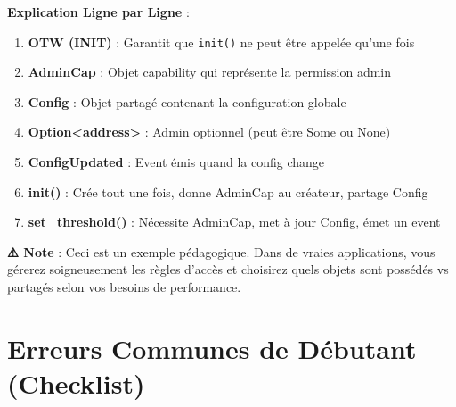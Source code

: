 \documentclass[11pt]{article}
\begin{document}
\begin{explainBox}
\textbf{Explication Ligne par Ligne} :
\begin{enumerate}
  \item \textbf{OTW (INIT)} : Garantit que \texttt{init()} ne peut être appelée qu'une fois
  \item \textbf{AdminCap} : Objet capability qui représente la permission admin
  \item \textbf{Config} : Objet partagé contenant la configuration globale
  \item \textbf{Option<address>} : Admin optionnel (peut être Some ou None)
  \item \textbf{ConfigUpdated} : Event émis quand la config change
  \item \textbf{init()} : Crée tout une fois, donne AdminCap au créateur, partage Config
  \item \textbf{set\_threshold()} : Nécessite AdminCap, met à jour Config, émet un event
\end{enumerate}
\end{explainBox}

\begin{warnBox}
\textbf{⚠️ Note} : Ceci est un exemple pédagogique. Dans de vraies applications, vous gérerez soigneusement les règles d'accès et choisirez quels objets sont possédés vs partagés selon vos besoins de performance.
\end{warnBox}

\section{Erreurs Communes de Débutant (Checklist)}
\end{document}
